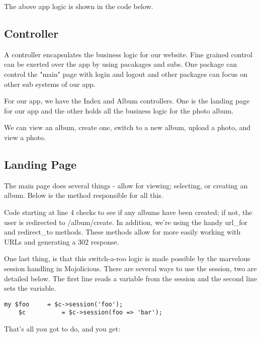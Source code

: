 \documentclass[14pt]{extreport}
\begin{document}
The above app logic is shown in the code below.



\subsection{Controller}

A controller encapsulates the business logic for our website.  Fine grained
control can be exerted over the app by using pacakages and subs.  One package
can control the "main" page with login and logout and other packages can focus
on other sub systems of our app.

For our app, we have the Index and Album controllers.  One is the landing page for
our app and the other holds all the business logic for the photo album.

We can view an album, create one, switch to a new album, upload a photo, and
view a photo.

\subsection{Landing Page}

The main page does several things - allow for viewing; selecting, or creating
an album.  Below is the method responsible for all this.



Code starting at line 4 checks to see if any albums have been created; if not,
the user is redirected to /album/create.  In addition, we're using the handy
url\_for and redirect\_to methods. These methods allow for more easily working
with URLs and generating a 302 response.

One last thing, is that this switch-a-roo logic is made possible by the
marvelous session handling in Mojolicious.  There are several ways to use the
session, two are detailed below.  The first line reads a variable from the
session and the second line sets the variable.

\begin{lstlisting}[style=BlockStyle]
    my $foo     = $c->session('foo');
    $c          = $c->session(foo => 'bar');
\end{lstlisting}

That's all you got to do, and you get:
\end{document}
